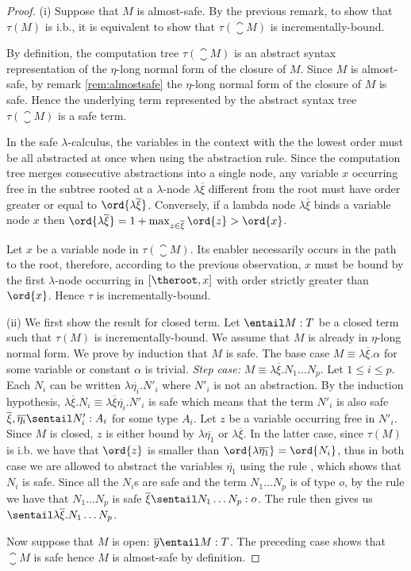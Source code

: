 \begin{proof}
(i) Suppose that $M$ is almost-safe. By the previous remark,
to show that $\tau(M)$ is i.b., it is equivalent to show that
$\tau(\closure{M})$ is incrementally-bound.

By definition, the computation tree $\tau(\closure{M})$ is
an abstract syntax representation of the $\eta$-long normal form of the closure of $M$.
Since $M$ is almost-safe, by remark \ref{rem:almostsafe} the
$\eta$-long normal form of the closure of $M$ is safe.
Hence the underlying term represented by the abstract syntax tree $\tau(\closure{M})$ is a safe term.

In the safe $\lambda$-calculus, the variables in the context with
the the lowest order must be all abstracted at once when using the
abstraction rule. Since the computation tree merges consecutive
abstractions into a single node, any variable $x$ occurring free in
the subtree rooted at a $\lambda$-node $\lambda \overline{\xi}$
different from the root must have order greater or equal to
$\ord{\lambda \overline{\xi}}$. Conversely, if a lambda node
$\lambda \overline{\xi}$ binds a variable node $x$ then
$\ord{\lambda \overline{\xi}} = 1+\max_{z\in\overline{\xi}} \ord{z}
> \ord{x}$.

Let $x$ be a variable node in $\tau(\closure{M})$.
Its enabler necessarily occurs in the path to the root, therefore, according to the previous observation,
$x$ must be bound by the first $\lambda$-node occurring in $[\theroot,x]$
with order strictly greater than $\ord{x}$. Hence $\tau$ is incrementally-bound.

(ii) We first show the result for closed term. Let $\entail M :T$ be a closed term such that $\tau(M)$ is incrementally-bound. We assume that $M$ is already in $\eta$-long normal form. We prove by induction that $M$ is safe. The
base case $M \equiv \lambda \overline{\xi} . \alpha$ for some variable or
constant $\alpha$ is trivial. \emph{Step case:} $M \equiv \lambda
\overline{\xi} . N_1 \ldots N_p$. Let $1\leq i\leq p$. Each $N_i$
can be written $\lambda \overline{\eta_i} . N'_i$ where $N'_i$ is
not an abstraction. By the induction hypothesis, $\lambda
\overline{\xi} . N_i \equiv \lambda\overline\xi\overline{\eta_i} .
N'_i$ is safe which means that the term $N'_i$ is also safe \ie
$\overline\xi, \overline{\eta_i} \sentail N'_i :A_i$ for some type $A_i$.
Let $z$ be a variable occurring free in $N'_i$. Since $M$ is
closed, $z$ is either bound by $\lambda \overline{\eta_1}$ or
$\lambda \overline{\xi}$. In the latter case, since $\tau(M)$ is
i.b. we have that $\ord{z}$ is smaller than $\ord{\lambda
\overline{\eta_1}}=\ord{N_i}$, thus in both case we are allowed to
abstract the variables $\overline{\eta_1}$ using the rule
, which shows that $N_i$ is safe.
Since all the $N_i$s are safe and the term $N_1 \ldots N_p$ is of type $o$, by the rule  we have that $N_1 \ldots N_p$ is safe \ie $\overline{\xi} \sentail N_1 \ldots N_p :o$. The rule  then gives us $\sentail \lambda \overline{\xi} . N_1 \ldots N_p$.

Now suppose that $M$ is open: $\overline{y} \entail M:T$. The preceding case shows that $\closure{M}$ is safe hence $M$ is almost-safe by definition.
\end{proof}

